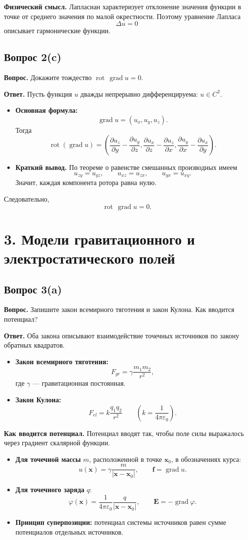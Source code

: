 \documentclass[a4paper,12pt]{article}
\newcommand{\grad}{\operatorname{grad}}
\newcommand{\rot}{\operatorname{rot}}
\newcommand{\Question}[2]{\subsection*{Вопрос #1}\textbf{Вопрос.} #2}
\newcommand{\Answer}{\textbf{Ответ.}}
\begin{document}
\textbf{Физический смысл.} Лапласиан характеризует отклонение значения функции в точке от среднего значения по малой окрестности. Поэтому уравнение Лапласа
\[
\Delta u=0
\]
описывает гармонические функции.

\Question{2(c)}{Докажите тождество $\rot\,\grad u = 0$.}

\Answer
Пусть функция $u$ дважды непрерывно дифференцируема: $u\in C^2$.

\begin{itemize}
  \item \textbf{Основная формула:}
  \[
  \grad u=(u_x,u_y,u_z).
  \]
  Тогда
  \[
  \rot(\grad u)=
  \left(
  \frac{\partial u_z}{\partial y}-\frac{\partial u_y}{\partial z},
  \frac{\partial u_x}{\partial z}-\frac{\partial u_z}{\partial x},
  \frac{\partial u_y}{\partial x}-\frac{\partial u_x}{\partial y}
  \right).
  \]
  \item \textbf{Краткий вывод.} По теореме о равенстве смешанных производных имеем
  \[
  u_{zy}=u_{yz}, \qquad
  u_{xz}=u_{zx}, \qquad
  u_{yx}=u_{xy}.
  \]
  Значит, каждая компонента ротора равна нулю.
\end{itemize}

Следовательно,
\[
\rot\,\grad u=0.
\]

\section*{3. Модели гравитационного и электростатического полей}

\Question{3(a)}{Запишите закон всемирного тяготения и закон Кулона. Как вводится потенциал?}

\Answer
Оба закона описывают взаимодействие точечных источников по закону обратных квадратов.

\begin{itemize}
  \item \textbf{Закон всемирного тяготения:}
  \[
  F_{gr}=\gamma\frac{m_1m_2}{r^2},
  \]
  где $\gamma$ --- гравитационная постоянная.

  \item \textbf{Закон Кулона:}
  \[
  F_{el}=k\frac{q_1q_2}{r^2}
  \qquad
  \left(
  k=\frac{1}{4\pi\varepsilon_0}
  \right).
  \]
\end{itemize}

\textbf{Как вводится потенциал.} Потенциал вводят так, чтобы поле силы выражалось через градиент скалярной функции.

\begin{itemize}
  \item \textbf{Для точечной массы} $m$, расположенной в точке $\mathbf{x}_0$, в обозначениях курса:
  \[
  u(\mathbf{x})=\gamma\frac{m}{|\mathbf{x}-\mathbf{x}_0|},
  \qquad
  \mathbf{f}=\grad u.
  \]

  \item \textbf{Для точечного заряда} $q$:
  \[
  \varphi(\mathbf{x})=\frac{1}{4\pi\varepsilon_0}\frac{q}{|\mathbf{x}-\mathbf{x}_0|},
  \qquad
  \mathbf{E}=-\grad \varphi.
  \]

  \item \textbf{Принцип суперпозиции:} потенциал системы источников равен сумме потенциалов отдельных источников.
\end{itemize}
\end{document}
